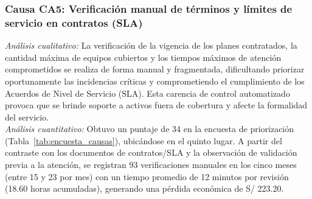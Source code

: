 \subsubsection{Causa CA5: Verificación manual de términos y límites de servicio en contratos (SLA)}
\noindent \textit{Análisis cualitativo:} La verificación de la vigencia de los planes contratados, la cantidad máxima de equipos cubiertos y los tiempos máximos de atención comprometidos se realiza de forma manual y fragmentada, dificultando priorizar oportunamente las incidencias críticas y comprometiendo el cumplimiento de los Acuerdos de Nivel de Servicio (SLA). Esta carencia de control automatizado provoca que se brinde soporte a activos fuera de cobertura y afecte la formalidad del servicio. \\

\noindent \textit{Análisis cuantitativo:}
Obtuvo un puntaje de 34 en la encuesta de priorización (Tabla~\ref{tab:encuesta_causas}), ubicándose en el quinto lugar. A partir del contraste con los documentos de contratos/SLA y la observación de validación previa a la atención, se registran 93 verificaciones manuales en los cinco meses (entre 15 y 23 por mes) con un tiempo promedio de 12 minutos por revisión (18.60 horas acumuladas), generando una pérdida económica de S/ 223.20.

